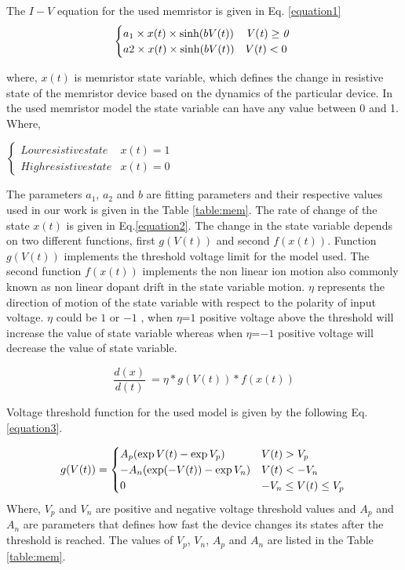 \documentclass[review]{elsarticle}
\begin{document}
The $I-V$ equation for the used memristor is given in Eq. \ref{equation1}  
\begin {equation}
\label{equation1}
\it \begin{cases} a_1\times x(t)\times \sinh(bV(t)) & \it V(t) \geq 0\\ a2\times x(t) \times \sinh(bV(t)) &  V(t) < 0\end{cases}\\
\end{equation}

where, $x(t)$ is memristor state variable, which defines the change in resistive state of the memristor device based on the dynamics of the particular device. In the used memristor model the state variable can have any value between 0 and 1. Where,


 \textit{ $\begin{cases} Low resistive state  & x(t) = 1\\ High resistive state & x(t) = 0\end{cases}$\\}

The parameters $a_{1}$, $a_{2}$ and $b$ are fitting parameters and their respective values used in our work is given in the Table \ref{table:mem}.
The rate of change of the state $x(t)$ is given in Eq.\ref{equation2}. The change in the state variable depends on two different functions, first $g(V(t))$ and second $f(x(t))$. Function $g(V(t))$ implements the threshold voltage limit for the model used. The second function $f(x(t))$ implements the non linear ion motion also commonly known as non linear dopant drift in the state variable motion. $\eta$ represents the direction of motion of the state variable with respect to the polarity of input voltage. $\eta$ could be $1$ or $-1$ , when $\eta$=$1$ positive voltage above the threshold will increase the value of state variable whereas when $\eta$=$-1$ positive voltage will decrease the value of state variable.

\begin{equation}
\label{equation2}
\frac {d(x)}{d(t)} \ = \eta* g(V(t))*f(x(t))
\end{equation}

Voltage threshold function for the used model is given by the following Eq.\ref{equation3}.

\begin{equation}
g(V(t))= \begin{cases} A_p (\exp V(t)-\exp V_p) & V(t) > V_p\\ - A_n (\exp(-V(t))-\exp V_n) &  V(t) < - V_n \\ 0 & -V_n \leq V(t) \leq V_p \end{cases}\\
\end{equation}
\label{equation3}
Where, $V_{p}$ and $V_{n}$ are positive and negative voltage threshold values and $A_{p}$ and $A_{n}$ are parameters that defines how fast the device changes its states after the threshold is reached. The values of $V_{p}$, $V_{n}$, $A_{p}$ and $A_{n}$ are listed in the Table \ref{table:mem}.
          
\end{document}
